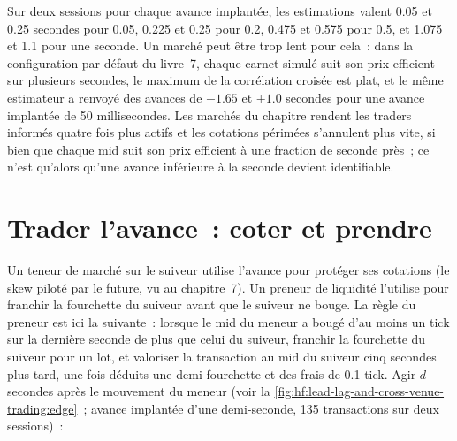 \begin{omfigure}

\label{fig:hf:lead-lag-and-cross-venue-trading:ccf}
\end{omfigure}

Sur deux sessions pour chaque avance implantée, les estimations valent 0.05 et 0.25 secondes pour 0.05, 0.225 et 0.25 pour 0.2, 0.475 et 0.575 pour 0.5, et 1.075
et 1.1 pour une seconde. Un marché peut être trop lent pour cela~: dans la configuration par défaut du livre~7, chaque carnet simulé suit son
prix efficient sur plusieurs secondes, le maximum de la corrélation croisée est plat, et le même estimateur a renvoyé des avances de $-1.65$ et $+1.0$ secondes pour une avance implantée de 50
millisecondes. Les marchés du chapitre rendent les traders informés quatre fois plus actifs et les cotations périmées s'annulent plus vite, si bien que chaque mid suit son
prix efficient à une fraction de seconde près~; ce n'est qu'alors qu'une avance inférieure à la seconde devient identifiable.

\section{Trader l'avance~: coter et prendre}

Un teneur de marché sur le suiveur utilise l'avance pour protéger ses cotations (le skew piloté par le future, vu au chapitre~7). Un preneur de liquidité l'utilise pour franchir la fourchette du suiveur
avant que le suiveur ne bouge. La règle du preneur est ici la suivante~: lorsque le mid du meneur a bougé d'au moins un tick sur la dernière seconde de plus que celui du suiveur,
franchir la fourchette du suiveur pour un lot, et valoriser la transaction au mid du suiveur cinq secondes plus tard, une fois déduits une demi-fourchette et des frais de 0.1 tick.
Agir $d$ secondes après le mouvement du meneur (voir la \cref{fig:hf:lead-lag-and-cross-venue-trading:edge}~; avance implantée d'une demi-seconde, 135 transactions sur deux
sessions)~:

